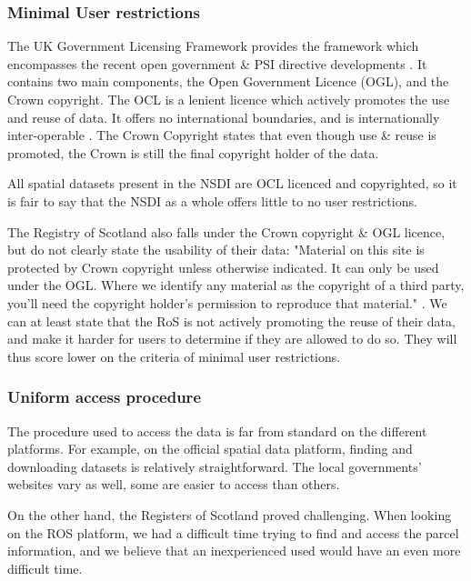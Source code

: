 \subsubsection{Minimal User restrictions} %

The UK Government Licensing Framework provides the framework which encompasses the recent open government \& PSI directive developments \citep{national_archives_ukglf}. It contains two main components, the Open Government Licence (OGL), and the Crown copyright. The OCL is a lenient licence which actively promotes the use and reuse of data. It offers no international boundaries, and is internationally inter-operable \citep{national_archives_ukglf_opengov}. The Crown Copyright states that even though use \& reuse is promoted, the Crown is still the final copyright holder of the data. 

All spatial datasets present in the NSDI are OCL licenced and copyrighted, so it is fair to say that the NSDI as a whole offers little to no user restrictions. 

The Registry of Scotland also falls under the Crown copyright \& OGL licence, but do not clearly state the usability of their data: "Material on this site is protected by Crown copyright unless otherwise indicated. It can only be used under the OGL. Where we identify any material as the copyright of a third party, you'll need the copyright holder's permission to reproduce that material." \citep{ros_crown_copyright}. We can at least state that the RoS is not actively promoting the reuse of their data, and make it harder for users to determine if they are allowed to do so. They will thus score lower on the criteria of minimal user restrictions. 

\subsubsection{Uniform access procedure}

The procedure used to access the data is far from standard on the different platforms. For example, on the official spatial data platform, finding and downloading datasets is relatively straightforward. The local governments' websites vary as well, some are easier to access than others.

On the other hand, the Registers of Scotland proved challenging. When looking on the ROS platform, we had a difficult time trying to find and access the parcel information, and we believe that an inexperienced used would have an even more difficult time. 

